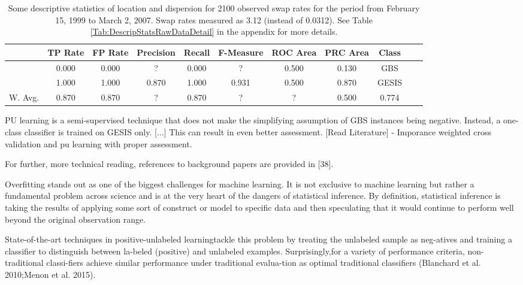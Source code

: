 \begin{table}[ht] 	
    \begin{center}
            {\footnotesize
            \begin{tabular}{l|cccccccccc}
                \hline \hline
                           &  TP Rate & FP Rate & Precision & Recall & F-Measure & ROC Area & PRC Area & Class \\
                \hline
                      & 0.000 & 0.000 & ? & 0.000 & ? & 0.500 & 0.130 & GBS &\\
                      & 1.000 & 1.000 & 0.870 & 1.000 & 0.931 & 0.500 & 0.870 & GESIS &\\
                \hline \hline
		 W. Avg. & 0.870 & 0.870 & ? & 0.870 & ? & ? & 0.500 & 0.774 &
            \end{tabular}}
        \caption{Some descriptive statistics of location and dispersion for 2100 observed swap rates for the period from February 15, 1999 to March 2, 2007. Swap rates measured as 3.12 (instead of 0.0312). See Table \ref{Tab:DescripStatsRawDataDetail} in the appendix for more details.}
\label{Tab:DescripStatsRawData}
\end{center}
\end{table}

PU learning is a semi-supervised technique that does not make the simplifying assumption of GBS instances being negative. Instead, a one-class classifier is trained on GESIS only. [...] This can result in even better assessment. [Read Literature] - Imporance weighted cross validation and pu learning with proper assessment.

For further, more technical reading, references to background papers are provided in [38].

Overﬁtting stands out as one of the biggest challenges for machine learning. It is not exclusive to machine learning but rather a fundamental problem across science and is at the very heart of the dangers of statistical inference. By deﬁnition, statistical inference is taking the results of applying some sort of construct or model to speciﬁc data and then speculating that it would continue to perform well beyond the original observation range.

State-of-the-art techniques in positive-unlabeled learningtackle this problem by treating the unlabeled sample as neg-atives and training a classiﬁer to distinguish between la-beled (positive) and unlabeled examples. 
Surprisingly,for a variety of performance criteria, non-traditional classi-ﬁers achieve similar performance under traditional evalua-tion as optimal traditional classiﬁers (Blanchard et al. 2010;Menon et al. 2015). 

